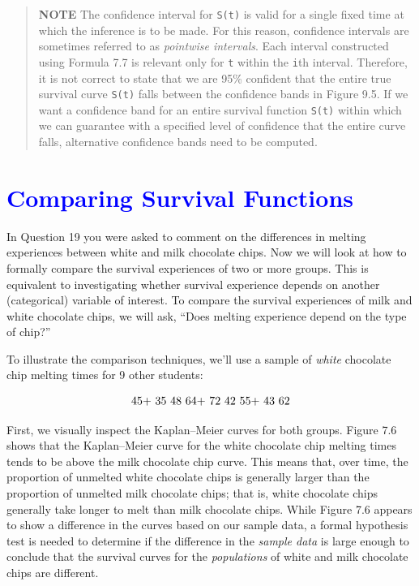 \documentclass[
]{report}
\begin{document}
\begin{quote}
\textbf{NOTE} The confidence interval for \texttt{S(t)} is valid for a single fixed time at which the inference is to be made. For this reason, confidence intervals are sometimes referred to as \emph{pointwise intervals}. Each interval constructed using Formula 7.7 is relevant only for \texttt{t} within the \texttt{i}th interval. Therefore, it is not correct to state that we are 95\% confident that the entire true survival curve \texttt{S(t)} falls between the confidence bands in Figure 9.5. If we want a confidence band for an entire survival function \texttt{S(t)} within which we can guarantee with a specified level of confidence that the entire curve falls, alternative confidence bands need to be computed.
\end{quote}

\hypertarget{section-82}{%
\section{\texorpdfstring{\textcolor{blue}{Comparing Survival Functions}}{}}\label{section-82}}

In Question 19 you were asked to comment on the differences in melting experiences between white and milk chocolate chips. Now we will look at how to formally compare the survival experiences of two or more groups. This is equivalent to investigating whether survival experience depends on another (categorical) variable of interest. To compare the survival experiences of milk and white chocolate chips, we will ask, ``Does melting experience depend on the type of chip?''

To illustrate the comparison techniques, we'll use a sample of \emph{white} chocolate chip melting times for 9 other students:

\begin{align}
\text{45+ 35 48 64+ 72 42 55+ 43 62}
\notag
\end{align}

First, we visually inspect the Kaplan--Meier curves for both groups. Figure 7.6 shows that the Kaplan--Meier curve for the white chocolate chip melting times tends to be above the milk chocolate chip curve. This means that, over time, the proportion of unmelted white chocolate chips is generally larger than the proportion of unmelted milk chocolate chips; that is, white chocolate chips generally take longer to melt than milk chocolate chips. While Figure 7.6 appears to show a difference in the curves based on our sample data, a formal hypothesis test is needed to determine if the difference in the \emph{sample data} is large enough to conclude that the survival curves for the \emph{populations} of white and milk chocolate chips are different.
\end{document}

